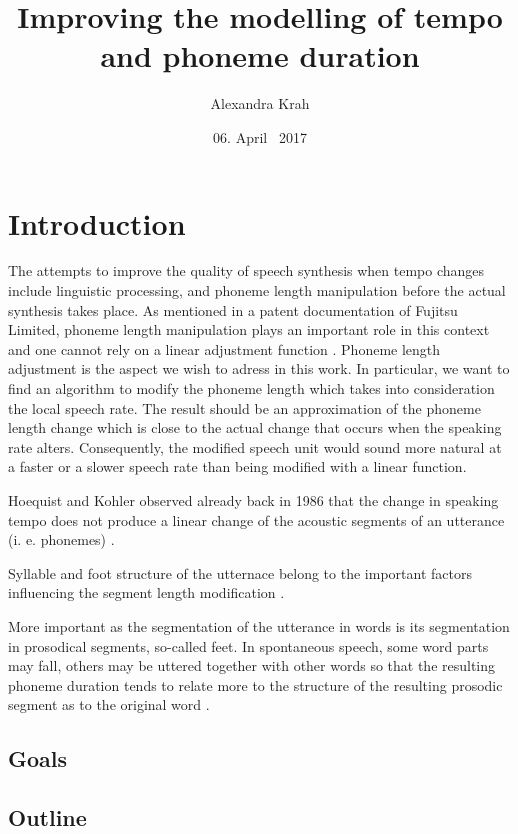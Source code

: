 \documentclass[a4paper]{scrreprt}
\begin{document}
\title{Improving the modelling of tempo and phoneme duration}
\author{Alexandra Krah}
\date{06. April ~2017}
\maketitle
\chapter*{}
\tableofcontents

\chapter{Introduction}
The attempts to improve the quality of speech synthesis when tempo changes include linguistic processing, and phoneme length manipulation before the actual synthesis takes place. As mentioned in a patent documentation of Fujitsu Limited, phoneme length manipulation plays an important role in this context and one cannot rely on a linear adjustment function \cite{nishiike2008}. Phoneme length adjustment is the aspect we wish to adress in this work. In particular, we want to find an algorithm to modify the phoneme length which takes into consideration the local speech rate. The result should be an approximation of the phoneme length change which is close to the actual change that occurs when the speaking rate alters. Consequently, the modified speech unit would sound more natural at a faster or a slower speech rate than being modified with a linear function.

Hoequist and Kohler observed already back in 1986 that the change in speaking tempo does not produce a linear change of the acoustic segments of an utterance (i. e. phonemes) \cite{Hoequist1986}. 

Syllable and foot structure of the utternace belong to the important factors influencing the segment length modification  \cite{Hoequist1986}.

More important as the segmentation of the utterance in words is its segmentation in prosodical segments, so-called feet. In spontaneous speech, some word parts may fall, others may be uttered together with other words so that the resulting phoneme duration tends to relate more to the structure of the resulting prosodic segment as to the original word \cite{Kohler1986}. 
\section{Goals}
\section{Outline}
\end{document}
